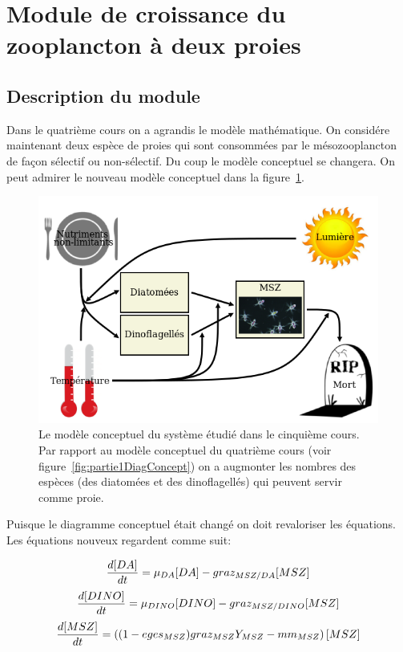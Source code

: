 \section{Module de croissance du zooplancton à deux proies}

\subsection{Description du module}

\par{
Dans le quatrième cours on a agrandis le modèle mathématique. On considére maintenant deux espèce de
proies qui sont consommées par le mésozooplancton de façon sélectif ou non-sélectif. Du coup le modèle
conceptuel se changera. On peut admirer le nouveau modèle conceptuel dans la figure~\ref{fig:partie2DiagConc}.
}

\begin{figure}[h!]
  \includegraphics[width=\textwidth]{partie2/diagConc.png}
  \caption{Le modèle conceptuel du système étudié dans le cinquième cours. Par rapport
au modèle conceptuel du quatrième cours (voir figure~\ref{fig:partie1DiagConcept}) on
a augmonter les nombres des espèces (des diatomées et des dinoflagellés) qui peuvent
servir comme proie.
}
  \label{fig:partie2DiagConc}
\end{figure}

\par{
Puisque le diagramme conceptuel était changé on doit revaloriser les équations. Les équations nouveux regardent
comme suit:
}

\begin{equation}
  {{d[DA]}\over{dt}} =
  \mu_{DA} [DA] - graz_{MSZ/DA} [MSZ]
  \label{eq:partie2DiffEq1}
\end{equation}
\begin{equation}
  {{d[DINO]}\over{dt}} =
  \mu_{DINO} [DINO] - graz_{MSZ/DINO} [MSZ]
  \label{eq:partie2DiffEq2}
\end{equation}
\begin{equation}
  {{d[MSZ]}\over{dt}} =
  \left (
    (1- eges_{MSZ}) graz_{MSZ} Y_{MSZ} - mm_{MSZ}
  \right ) [MSZ]
  \label{eq:partie2DiffEq3}
\end{equation}


